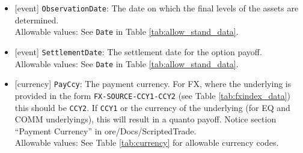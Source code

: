 \begin{itemize}
  \item{}[event] \lstinline!ObservationDate!: The date on which the final levels of the assets are determined. \\
  Allowable values: See \lstinline!Date! in Table \ref{tab:allow_stand_data}.
  \item{}[event] \lstinline!SettlementDate!: The settlement date for the option payoff. \\
  Allowable values: See \lstinline!Date! in Table \ref{tab:allow_stand_data}.
  \item{}[currency] \lstinline!PayCcy!: The payment currency. For FX, where the underlying is provided
      in the form \lstinline!FX-SOURCE-CCY1-CCY2! (see Table \ref{tab:fxindex_data}) this should
      be \lstinline!CCY2!. If \lstinline!CCY1! or the currency of the underlying (for EQ and
      COMM underlyings), this will result in a quanto payoff. Notice section ``Payment Currency'' in ore/Docs/ScriptedTrade. \\
        Allowable values: See Table \ref{tab:currency} for allowable currency codes.
\end{itemize}

